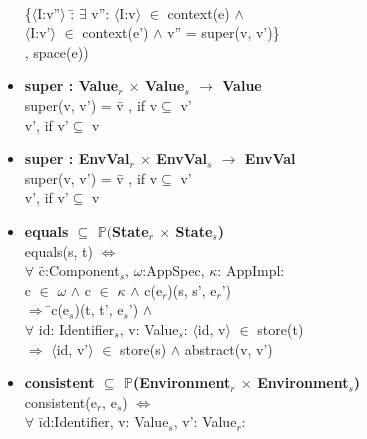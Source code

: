 \documentclass[conference]{IEEEtran}
\begin{document}
\begin{itemize}
\begin{tabbing}
\\\>\{$\langle$I:v''$\rangle$ :\= $\exists$ v'': $\langle$I:v$\rangle$ $\in$ context(e) $\wedge$ 
\\\>\>$\langle$I:v'$\rangle$ $\in$ context(e') $\wedge$  v'' = super(v, v')\}
\\\>\>, space(e))
\end{tabbing}
\item \begin{tabbing}\textbf{super : Value$_r$ $\times$ Value$_s$ $\rightarrow$ Value}
\\super(v, v') = \= v	, if \textlbrackdbl v\textrbrackdbl $\subseteq$ \textlbrackdbl v'\textrbrackdbl
\\\> v', if \textlbrackdbl v'\textrbrackdbl $\subseteq$ \textlbrackdbl v\textrbrackdbl
\end{tabbing}
\item \begin{tabbing}\textbf{super : EnvVal$_r$ $\times$ EnvVal$_s$ $\rightarrow$ EnvVal}
\\super(v, v') = \= v	, if \textlbrackdbl v\textrbrackdbl $\subseteq$ \textlbrackdbl v'\textrbrackdbl
\\\> v', if \textlbrackdbl v'\textrbrackdbl $\subseteq$ \textlbrackdbl v\textrbrackdbl
\end{tabbing}
\item \begin{tabbing}\textbf{equals $\subseteq$ $\mathbb{P}($State$_r$ $\times$ State$_s$)}
\\equals(s, t) $\Leftrightarrow$
\\ $\forall$ \=c:Component$_s$, $\omega$:AppSpec, $\kappa$: AppImpl: 
\\\>c $\in$ $\omega$ $\wedge$ c $\in$ $\kappa$ $\wedge$ \textlbrackdbl c\textrbrackdbl(e$_r$)(s, s', e$_r$') 
\\$\Rightarrow$ \=\textlbrackdbl c\textrbrackdbl(e$_s$)(t, t', e$_s$') $\wedge$ \\\>$\forall$ id: Identifier$_s$, v: Value$_s$: 
$\langle$id, v$\rangle$ $\in$ store(t) 
\\\>$\Rightarrow$
$\langle$id, v'$\rangle$ $\in$ store(s) $\wedge$ abstract(v, v')
\end{tabbing}
\item \begin{tabbing}\textbf{consistent $\subseteq$ $\mathbb{P}$(Environment$_r$ $\times$ Environment$_s$)}
\\consistent(e$_r$, e$_s$) $\Leftrightarrow$
\\ $\forall$ \=id:Identifier, v: Value$_s$, v': Value$_r$: 

\end{tabbing}
\end{itemize}
\end{document}
